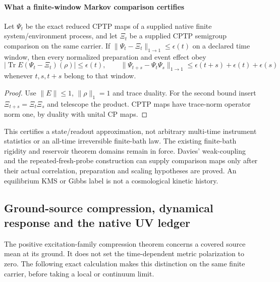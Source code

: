 \documentclass[12pt,a4paper]{article}
\begin{document}
\paragraph{What a finite-window Markov comparison certifies}
\begin{proposition}
\label{p4:prop:v2210-lit-markov-window}
Let $\Psi_t$ be the exact reduced CPTP maps of a supplied native finite
system/environment process, and let $\Xi_t$ be a supplied CPTP semigroup
comparison on the same carrier. If
$\|\Psi_t-\Xi_t\|_{1\to1}\le\epsilon(t)$ on a declared time window,
then every normalized preparation and event effect obey
\[
 |\operatorname{Tr}E(\Psi_t-\Xi_t)(\rho)|\le\epsilon(t),\qquad
 \|\Psi_{t+s}-\Psi_t\Psi_s\|_{1\to1}
 \le\epsilon(t+s)+\epsilon(t)+\epsilon(s)
\]
whenever $t,s,t+s$ belong to that window.
\end{proposition}
\begin{proof}
Use $\|E\|\le1$, $\|\rho\|_1=1$ and trace duality. For the second
bound insert $\Xi_{t+s}=\Xi_t\Xi_s$ and telescope the product. CPTP
maps have trace-norm operator norm one, by duality with unital CP maps.
\end{proof}
This certifies a state/readout approximation, not arbitrary multi-time
instrument statistics or an all-time irreversible finite-bath law.
The existing finite-bath rigidity and reservoir theorem domains remain in
force. Davies' weak-coupling and the repeated-fresh-probe construction
\cite{Davies1974,LitQFTAttalPautrat2006} can supply comparison maps only
after their actual correlation, preparation and scaling hypotheses are
proved. An equilibrium KMS or Gibbs label is not a cosmological kinetic
history.



\subsection{Ground-source compression, dynamical response and the native UV ledger}
\label{p4:sec:v2216-source-polarization-uv}

The positive excitation-family compression theorem concerns a covered
source mean at its ground. It does not set the time-dependent metric
polarization to zero. The following exact calculation makes this distinction
on the same finite carrier, before taking a local or continuum limit.
\end{document}
